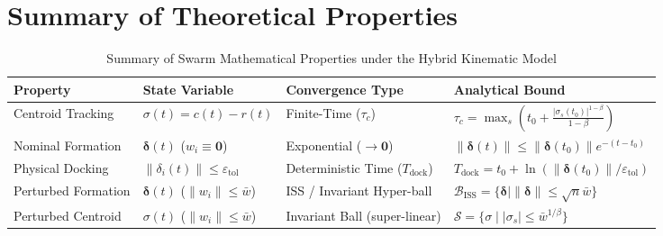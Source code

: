 \documentclass[11pt]{article}
\begin{document}
\section{Summary of Theoretical Properties}

\begin{table}[htbp]
\centering
\caption{Summary of Swarm Mathematical Properties under the Hybrid Kinematic Model}
\vspace{0.2cm}
\begin{tabular}{@{}llll@{}}
\toprule
\textbf{Property} & \textbf{State Variable} & \textbf{Convergence Type} & \textbf{Analytical Bound} \\ \midrule
Centroid Tracking & $\sigma(t) = c(t) - r(t)$ & Finite-Time ($\tau_c$) & $\tau_c = \max_s \left(t_0 + \frac{|\sigma_s(t_0)|^{1-\beta}}{1-\beta}\right)$ \\
Nominal Formation & $\boldsymbol{\delta}(t)$ ($w_i \equiv \mathbf{0}$) & Exponential ($\to \mathbf{0}$) & $\|\boldsymbol{\delta}(t)\| \le \|\boldsymbol{\delta}(t_0)\| e^{-(t-t_0)}$ \\
Physical Docking & $\|\delta_i(t)\| \le \varepsilon_{\text{tol}}$ & Deterministic Time ($T_{\text{dock}}$) & $T_{\text{dock}} = t_0 + \ln(\|\boldsymbol{\delta}(t_0)\| / \varepsilon_{\text{tol}})$ \\
Perturbed Formation & $\boldsymbol{\delta}(t)$ ($\|w_i\| \le \bar{w}$) & ISS / Invariant Hyper-ball & $\mathcal{B}_{\text{ISS}} = \{\boldsymbol{\delta} \mid \|\boldsymbol{\delta}\| \le \sqrt{n}\bar{w}\}$ \\
Perturbed Centroid & $\sigma(t)$ ($\|w_i\| \le \bar{w}$) & Invariant Ball (super-linear) & $\mathcal{S} = \{\sigma \mid |\sigma_s| \le \bar{w}^{1/\beta}\}$ \\ \bottomrule
\end{tabular}
\end{table}
\end{document}

